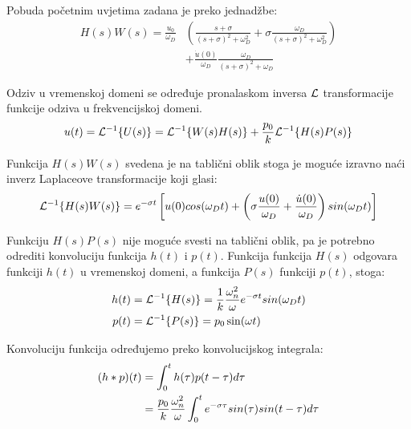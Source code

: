 Pobuda početnim uvjetima zadana je preko jednadžbe:
\begin{equation}
    \begin{split}
        H(s)W(s)=\frac{u_0}{\omega_D}&\left(
        \frac{s+\sigma}{(s+\sigma)^2+\omega_D^2} +
	\sigma\frac{\omega_D}{(s+\sigma)^2+\omega_D^2}\right)\\
        &+ \frac{\dot{u}(0)}{\omega_D}\frac{\omega_D}{(s+\sigma)^2+\omega_D}
    \end{split}
\end{equation}

Odziv u vremenskoj domeni se određuje pronalaskom inversa $\mathcal{L}$ transformacije
funkcije odziva u frekvencijskoj domeni.
\begin{equation}
	u(t)=\mathcal{L}^{-1}\{U(s)\}=\mathcal{L}^{-1}\{W(s)H(s)\}+\frac{p_0}{k}\mathcal{L}^{-1}\{H(s)P(s)\}
	\label{eq:inverz_prvi_korak}
\end{equation}

Funkcija $H(s)W(s)$ svedena je na tablični oblik stoga je moguće izravno naći inverz
Laplaceove transformacije koji glasi:
\begin{equation}
	\mathcal{L}^{-1}\{H(s)W(s)\} = e^{-\sigma t}\left[
		u(0)cos(\omega_Dt)+\left(
			\sigma\frac{u(0)}{\omega_D}+\frac{\dot{u}(0)}{\omega_D}
			\right)sin(\omega_Dt)\right] \label{eq:pobuda_pocetnim_uvjetima}
\end{equation}

Funkciju $H(s)P(s)$ nije moguće svesti na tablični oblik, pa je potrebno odrediti
konvoluciju funkcija $h(t)$ i $p(t)$. Funkcija funkcija $H(s)$ odgovara funkciji 
$h(t)$ u vremenskoj domeni, a funkcija $P(s)$ funkciji $p(t)$, stoga:
\begin{align}
        h(t)&=\mathcal{L}^{-1}\{H(s)\}=\frac{1}{k}\frac{\omega_n^2}{\omega}e^{-\sigma t}sin(\omega_Dt)\label{eq:pfs_vremenska_domena}\\
	p(t)&=\mathcal{L}^{-1}\{P(s)\}=p_0\sin(\omega t) \label{eq:pobuda_vremenska_domena}
\end{align}

Konvoluciju funkcija određujemo preko konvolucijskog integrala:
\begin{align}\label{eq:konvolucijski_integral}
	(h*p)(t)&=\int_0^th(\tau)p(t-\tau)d\tau \notag\\
		&=\frac{p_0}{k}\frac{\omega_n^2}{\omega}
		\int_0^te^{-\sigma\tau}sin(\tau)sin(t-\tau)d\tau
\end{align}

